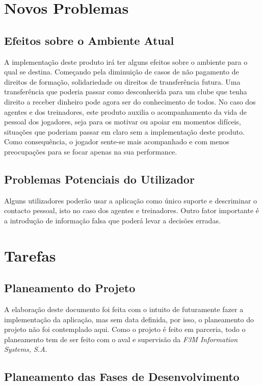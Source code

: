 \section{Novos Problemas}

\subsection{Efeitos sobre o Ambiente Atual}

A implementação deste produto irá ter alguns efeitos sobre o ambiente para o qual se destina. Começando pela diminuição de casos de não pagamento de direitos de formação, solidariedade ou direitos de transferência futura. Uma transferência que poderia passar como desconhecida para um clube que tenha direito a receber dinheiro pode agora ser do conhecimento de todos.
No caso dos agentes e dos treinadores, este produto auxilia o acompanhamento da vida de pessoal dos jogadores, seja para os motivar ou apoiar em momentos difíceis, situações que poderiam passar em claro sem a implementação deste produto. Como consequência, o jogador sente-se mais acompanhado e com menos preocupações para se focar apenas na sua performance.

\subsection{Problemas Potenciais do Utilizador}

Alguns utilizadores poderão usar a aplicação como único suporte e descriminar o contacto pessoal, isto no caso dos agentes e treinadores. Outro fator importante é a introdução de informação falsa que poderá levar a decisões erradas.


\section{Tarefas}

\subsection{Planeamento do Projeto}

A elaboração deste documento foi feita com o intuito de futuramente fazer a implementação da aplicação, mas sem data definida, por isso, o planeamento do projeto não foi contemplado aqui.
Como o projeto é feito em parceria, todo o planeamento tem de ser feito com o aval e supervisão da \emph{F3M Information Systems, S.A}.

\subsection{Planeamento das Fases de Desenvolvimento}

